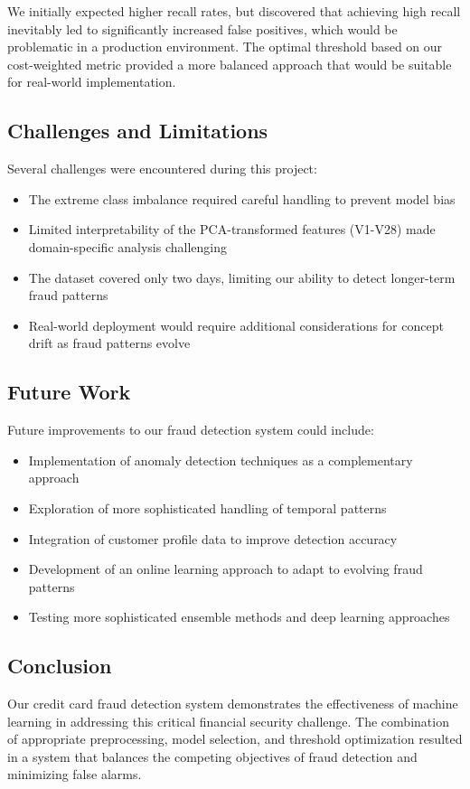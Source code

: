 \documentclass{article}
\begin{document}
We initially expected higher recall rates, but discovered that achieving high recall inevitably led to significantly increased false positives, which would be problematic in a production environment. The optimal threshold based on our cost-weighted metric provided a more balanced approach that would be suitable for real-world implementation.

\subsection{Challenges and Limitations}
Several challenges were encountered during this project:
\begin{itemize}
    \item The extreme class imbalance required careful handling to prevent model bias
    \item Limited interpretability of the PCA-transformed features (V1-V28) made domain-specific analysis challenging
    \item The dataset covered only two days, limiting our ability to detect longer-term fraud patterns
    \item Real-world deployment would require additional considerations for concept drift as fraud patterns evolve
\end{itemize}

\subsection{Future Work}
Future improvements to our fraud detection system could include:
\begin{itemize}
    \item Implementation of anomaly detection techniques as a complementary approach
    \item Exploration of more sophisticated handling of temporal patterns
    \item Integration of customer profile data to improve detection accuracy
    \item Development of an online learning approach to adapt to evolving fraud patterns
    \item Testing more sophisticated ensemble methods and deep learning approaches
\end{itemize}

\subsection{Conclusion}
Our credit card fraud detection system demonstrates the effectiveness of machine learning in addressing this critical financial security challenge. The combination of appropriate preprocessing, model selection, and threshold optimization resulted in a system that balances the competing objectives of fraud detection and minimizing false alarms.
\end{document}
